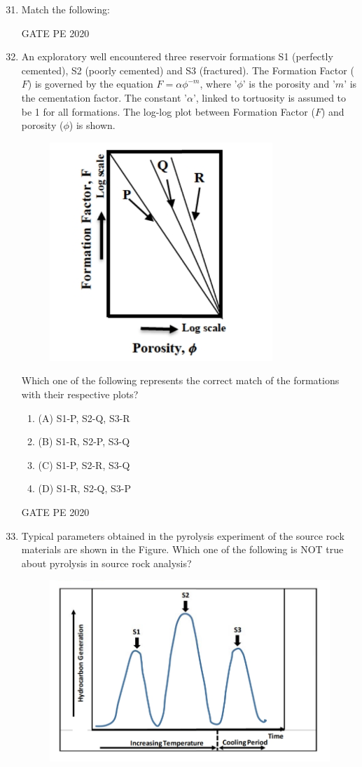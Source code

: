 \documentclass[journal,12pt,onecolumn]{IEEEtran}
\theoremstyle{remark}
\begin{document}
\begin{enumerate}
\setcounter{enumi}{30} %

\item Match the following:

  \hfill{GATE PE 2020}
   
\item An exploratory well encountered three reservoir formations S1 (perfectly cemented), S2 (poorly cemented) and S3 (fractured). The Formation Factor ($F$) is governed by the equation $F = \alpha \phi^{-m}$, where '$\phi$' is the porosity and '$m$' is the cementation factor. The constant '$\alpha$', linked to tortuosity is assumed to be 1 for all formations. The log-log plot between Formation Factor ($F$) and porosity ($\phi$) is shown.
\begin{figure}[h]
    \centering
    \includegraphics[width=0.2\linewidth]{figs/6.jpeg}
    \caption{}
    \label{fig:placeholder}
\end{figure}



Which one of the following represents the correct match of the formations with their respective plots?

  
\begin{multicols}{2}
\begin{enumerate}
\item (A) S1-P, S2-Q, S3-R
\item (B) S1-R, S2-P, S3-Q
\item (C) S1-P, S2-R, S3-Q
\item (D) S1-R, S2-Q, S3-P
\end{enumerate}
\end{multicols}


  \hfill{GATE PE 2020}
   
\item Typical parameters obtained in the pyrolysis experiment of the source rock materials are shown in the Figure. Which one of the following is NOT true about pyrolysis in source rock analysis?

\begin{figure}[h]
    \centering
    \includegraphics[width=0.4\linewidth]{figs/7.jpeg}
    \caption{}
    \label{fig:placeholder}
\end{figure}



\end{enumerate}
\end{document}
